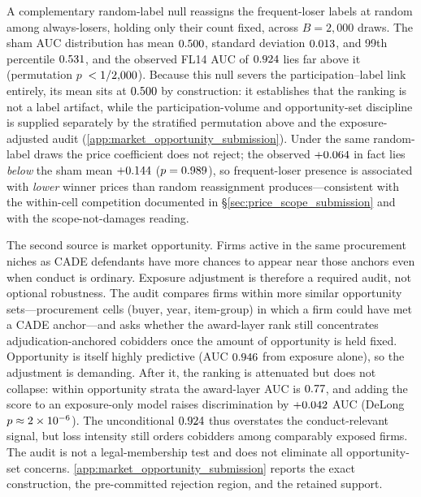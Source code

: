 A complementary random-label null reassigns the frequent-loser
labels at random among always-losers, holding only their count
fixed, across $B=2{,}000$ draws. The sham AUC distribution has
mean $0.500$, standard deviation $0.013$, and 99th
percentile $0.531$, and the observed FL14 AUC of
$0.924$ lies far above it (permutation $p$~$<1/2{,}000$).
Because this null severs the participation--label link entirely,
its mean sits at $0.500$ by construction: it establishes
that the ranking is not a label artifact, while the
participation-volume and opportunity-set discipline is supplied
separately by the stratified permutation above and the
exposure-adjusted audit
(\ref{app:market_opportunity_submission}). Under the same
random-label draws the price coefficient does not reject; the
observed $+0.064$ in fact lies \emph{below} the sham
mean $+0.144$ ($p=0.989$), so frequent-loser
presence is associated with \emph{lower} winner prices than
random reassignment produces---consistent with the within-cell
competition documented in \S\ref{sec:price_scope_submission} and
with the scope-not-damages reading.

The second source is market opportunity. Firms active in the
same procurement niches as CADE defendants have more chances to
appear near those anchors even when conduct is ordinary.
Exposure adjustment is therefore a required audit, not optional
robustness. The audit compares firms within more similar
opportunity sets---procurement cells (buyer, year, item-group) in
which a firm could have met a CADE anchor---and asks whether the
award-layer rank still concentrates adjudication-anchored
cobidders once the amount of opportunity is held fixed.
Opportunity is itself highly predictive (AUC
$0.946$ from exposure alone), so the adjustment
is demanding. After it, the ranking is attenuated but does not
collapse: within opportunity strata the award-layer AUC is
$0.77$, and adding the score to an
exposure-only model raises discrimination by $+0.042$ AUC
(DeLong $p\approx2\times10^{-6}$). The unconditional $0.924$
thus overstates the conduct-relevant signal, but loss intensity
still orders cobidders among comparably exposed firms. The audit
is not a legal-membership test and does not eliminate all
opportunity-set concerns. \ref{app:market_opportunity_submission}
reports the exact construction, the pre-committed rejection
region, and the retained support.


